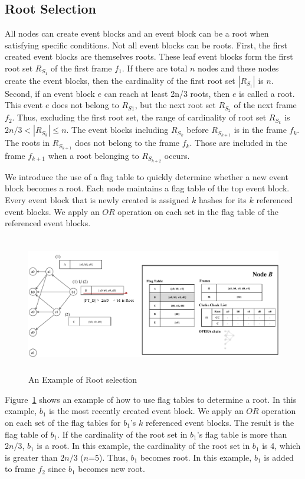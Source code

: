 \documentclass{article}
\begin{document}
\subsection{Root Selection}
All nodes can create event blocks and an event block can be a root when satisfying specific conditions. Not all event blocks can be roots. First, the first created event blocks are themselves roots. These leaf event blocks form the first root set $R_{S_1}$ of the first frame $f_1$. If there are total $n$ nodes and these nodes create the event blocks, then the cardinality of the first root set $|R_{S_1}|$ is $n$. Second, if an event block $e$ can reach at least 2n/3 roots, then $e$ is called a root. This event $e$ does not belong to $R_{S1}$, but the next root set $R_{S_2}$ of the next frame $f_2$. Thus, excluding the first root set, the range of cardinality of root set $R_{S_k}$ is $2n/3 < |R_{S_k}| \leq n$. The event blocks including $R_{S_k}$ before $R_{S_{k+1}}$ is in the frame $f_k$. The roots in $R_{S_{k+1}}$ does not belong to the frame $f_k$. Those are included in the frame $f_{k+1}$ when a root belonging to $R_{S_{k+2}}$ occurs.  

We introduce the use of a flag table to quickly determine whether a new event block becomes a root. Each node maintains a flag table of the top event block.
Every event block that is newly created is assigned $k$ hashes for its $k$ referenced event blocks. We apply an $OR$ operation on each set in the flag table of the referenced event blocks.

\begin{figure} [h] \centering  
\includegraphics[height=6cm, width=1.0\columnwidth]{Root_selection.pdf}
\caption{An Example of Root selection}
\label{fig:ex_ft}
\end{figure}

\newpage
Figure~\ref{fig:ex_ft} shows an example of how to use flag tables to determine a root. In this example, $b_1$ is the most recently created event block. We apply an $OR$ operation on each set of the flag tables for $b_1$'s $k$ referenced event blocks. The result is the flag table of $b_1$.  If the cardinality of the root set in $b_1$'s flag table is more than $2n/3$, $b_1$ is a root. In this example, the cardinality of the root set in $b_1$ is 4, which is greater than $2n/3$ ($n$=5). Thus, $b_1$ becomes root. In this example, $b_1$ is added to frame $f_2$ since $b_1$ becomes new root. 
\end{document}
